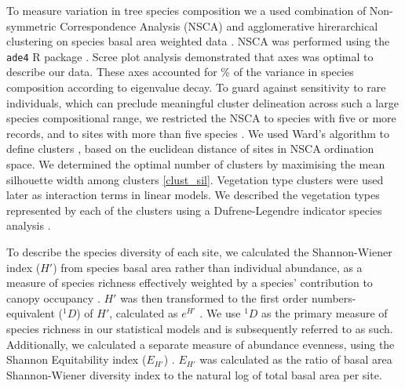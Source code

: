 \documentclass[11pt,a4paper]{article}
\begin{document}
To measure variation in tree species composition we a used combination of Non-symmetric Correspondence Analysis (NSCA) and agglomerative hirerarchical clustering on species basal area weighted data \citep{Kreft2010, Fayolle2014}. NSCA was performed using the \texttt{ade4} R package \citep{ade4}. Scree plot analysis demonstrated that \nscaAxes{} axes was optimal to describe our data. These axes accounted for \nscaInertia{}\% of the variance in species composition according to eigenvalue decay. To guard against sensitivity to rare individuals, which can preclude meaningful cluster delineation across such a large species compositional range, we restricted the NSCA to species with five or more records, and to sites with more than five species \citep{}. We used Ward's algorithm to define clusters \citep{Murtagh2014}, based on the euclidean distance of sites in NSCA ordination space. We determined the optimal number of clusters by maximising the mean silhouette width among clusters \citep{Rousseeuw1987} \autoref{clust_sil}. Vegetation type clusters were used later as interaction terms in linear models. We described the vegetation types represented by each of the clusters using a Dufrene-Legendre indicator species analysis \citep{Dufrene1997}.

To describe the species diversity of each site, we calculated the Shannon-Wiener index ($H'$) from species basal area rather than individual abundance, as a measure of species richness effectively weighted by a species' contribution to canopy occupancy \citep{}. $H'$ was then transformed to the first order numbers-equivalent ($^1\!D$) of $H'$, calculated as $e^{H'}$ \citep{}. We use $^1\!D$ as the primary measure of species richness in our statistical models and is subsequently referred to as such. Additionally, we calculated a separate measure of abundance evenness, using the Shannon Equitability index ($E_{H'}$) \citep{Smith1996}. $E_{H'}$ was calculated as the ratio of basal area Shannon-Wiener diversity index to the natural log of total basal area per site. 
\end{document}
